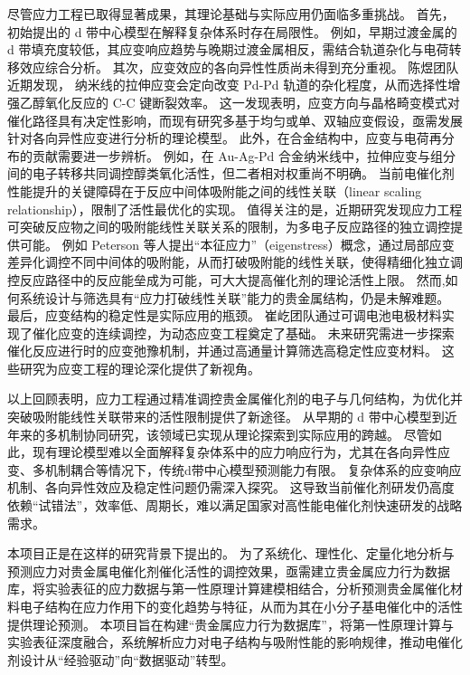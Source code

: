尽管应力工程已取得显著成果，其理论基础与实际应用仍面临多重挑战。
首先，初始提出的 d 带中心模型在解释复杂体系时存在局限性。
例如，早期过渡金属的 d 带填充度较低，其应变响应趋势与晚期过渡金属相反，需结合轨道杂化与电荷转移效应综合分析\cite{Schnur_2010}。
其次，应变效应的各向异性性质尚未得到充分重视。
陈煜团队近期发现， 纳米线的拉伸应变会定向改变 Pd-Pd 轨道的杂化程度，从而选择性增强乙醇氧化反应的 C-C 键断裂效率\cite{Miao_2024}。
这一发现表明，应变方向与晶格畸变模式对催化路径具有决定性影响，而现有研究多基于均匀或单、双轴应变假设，亟需发展针对各向异性应变进行分析的理论模型。
此外，在合金结构中，应变与电荷再分布的贡献需要进一步辨析。
例如，在 Au-Ag-Pd 合金纳米线中，拉伸应变与组分间的电子转移共同调控醇类氧化活性，但二者相对权重尚不明确\cite{Zhang_2021}。
当前电催化剂性能提升的关键障碍在于反应中间体吸附能之间的线性关联（linear
scaling
relationship），限制了活性最优化的实现。
值得关注的是，近期研究发现应力工程可突破反应物之间的吸附能线性关联关系的限制，为多电子反应路径的独立调控提供可能。
例如 Peterson 等人提出``本征应力''（eigenstress）概念，通过局部应变差异化调控不同中间体的吸附能，从而打破吸附能的线性关联，使得精细化独立调控反应路径中的反应能垒成为可能，可大大提高催化剂的理论活性上限\cite{Khorshidi_2018}。
然而,如何系统设计与筛选具有“应力打破线性关联”能力的贵金属结构，仍是未解难题。
最后，应变结构的稳定性是实际应用的瓶颈。
崔屹团队通过可调电池电极材料实现了催化应变的连续调控，为动态应变工程奠定了基础\cite{Wang_2016}。
未来研究需进一步探索催化反应进行时的应变弛豫机制\cite{Chattot_2021}，并通过高通量计算筛选高稳定性应变材料。
这些研究为应变工程的理论深化提供了新视角。

以上回顾表明，应力工程通过精准调控贵金属催化剂的电子与几何结构，为优化并突破吸附能线性关联带来的活性限制提供了新途径。
从早期的 d 带中心模型到近年来的多机制协同研究，该领域已实现从理论探索到实际应用的跨越。
尽管如此，现有理论模型难以全面解释复杂体系中的应力响应行为，尤其在各向异性应变、多机制耦合等情况下，传统d带中心模型预测能力有限。
复杂体系的应变响应机制、各向异性效应及稳定性问题仍需深入探究。
这导致当前催化剂研发仍高度依赖“试错法”，效率低、周期长，难以满足国家对高性能电催化剂快速研发的战略需求。

本项目正是在这样的研究背景下提出的。
为了系统化、理性化、定量化地分析与预测应力对贵金属电催化剂催化活性的调控效果，亟需建立贵金属应力行为数据库，将实验表征的应力数据与第一性原理计算建模相结合，分析预测贵金属催化材料电子结构在应力作用下的变化趋势与特征，从而为其在小分子基电催化中的活性提供理论预测。
本项目旨在构建“贵金属应力行为数据库”，将第一性原理计算与实验表征深度融合，系统解析应力对电子结构与吸附性能的影响规律，推动电催化剂设计从“经验驱动”向“数据驱动”转型。

